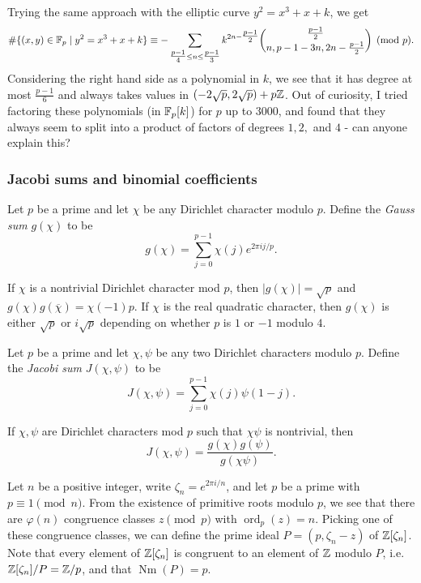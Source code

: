 \documentclass[letterpaper,11pt]{article}
\DeclareMathOperator{\ord}{ord}
\DeclareMathOperator{\Nm}{Nm}
\begin{document}
\begin{rem} Trying the same approach with the elliptic curve $y^2 = x^3+x+k$, we get
\[
\#\{(x,y)\in\mathbb{F}_p\mid y^2=x^3+x+k\} \equiv -\sum_{\tfrac{p-1}{4}\le n\le\tfrac{p-1}{3}} k^{2n-\tfrac{p-1}{2}}\binom{\tfrac{p-1}{2}}{n,p-1-3n,2n-\tfrac{p-1}{2}}\pmod{p}.
\]
Considering the right hand side as a polynomial in $k$, we see that it has degree at most $\frac{p-1}{6}$ and always takes values in $(-2\sqrt{p},2\sqrt{p}) + p\mathbb{Z}$. Out of curiosity, I tried factoring these polynomials (in $\mathbb{F}_p[k]$) for $p$ up to $3000$, and found that they always seem to split into a product of factors of degrees $1,2,$ and $4$ - can anyone explain this?
\end{rem}

\subsubsection{Jacobi sums and binomial coefficients}

\begin{defn} Let $p$ be a prime and let $\chi$ be any Dirichlet character modulo $p$. Define the \emph{Gauss sum} $g(\chi)$ to be
\[
g(\chi) = \sum_{j=0}^{p-1} \chi(j)e^{2\pi ij/p}.
\]
\end{defn}

\begin{prop} If $\chi$ is a nontrivial Dirichlet character mod $p$, then $|g(\chi)| = \sqrt{p}$ and $g(\chi)g(\overline{\chi}) = \chi(-1)p$. If $\chi$ is the real quadratic character, then $g(\chi)$ is either $\sqrt{p}$ or $i\sqrt{p}$ depending on whether $p$ is $1$ or $-1$ modulo $4$.
\end{prop}

\begin{defn} Let $p$ be a prime and let $\chi, \psi$ be any two Dirichlet characters modulo $p$. Define the \emph{Jacobi sum} $J(\chi, \psi)$ to be
\[
J(\chi,\psi) = \sum_{j=0}^{p-1} \chi(j)\psi(1-j).
\]
\end{defn}

\begin{prop} If $\chi, \psi$ are Dirichlet characters mod $p$ such that $\chi\psi$ is nontrivial, then
\[
J(\chi,\psi) = \frac{g(\chi)g(\psi)}{g(\chi\psi)}.
\]
\end{prop}

Let $n$ be a positive integer, write $\zeta_n = e^{2\pi i/n}$, and let $p$ be a prime with $p \equiv 1 \pmod{n}$. From the existence of primitive roots modulo $p$, we see that there are $\varphi(n)$ congruence classes $z \pmod{p}$ with $\ord_p(z) = n$. Picking one of these congruence classes, we can define the prime ideal $P = (p,\zeta_n-z)$ of $\mathbb{Z}[\zeta_n]$. Note that every element of $\mathbb{Z}[\zeta_n]$ is congruent to an element of $\mathbb{Z}$ modulo $P$, i.e. $\mathbb{Z}[\zeta_n]/P = \mathbb{Z}/p$, and that $\Nm(P) = p$.
\end{document}
